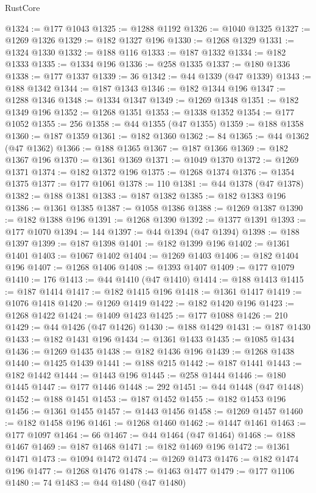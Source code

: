 \begin{lexlean}{RustCore}
\begin{coremodule}
@1324 := @177 @1043
@1325 := @1288 @1192
@1326 := @1040 @1325
@1327 := @1269 @1326
@1329 := @182 @1327 @196
@1330 := @1268 @1329
@1331 := @1324 @1330
@1332 := @188 @116
@1333 := @187 @1332
@1334 := @182 @1333
@1335 := @1334 @196
@1336 := @258 @1335
@1337 := @180 @1336
@1338 := @177 @1337
@1339 := 36
@1342 := @44 @1339 (@47 @1339)
@1343 := @188 @1342
@1344 := @187 @1343
@1346 := @182 @1344 @196
@1347 := @1288 @1346
@1348 := @1334 @1347
@1349 := @1269 @1348
@1351 := @182 @1349 @196
@1352 := @1268 @1351
@1353 := @1338 @1352
@1354 := @177 @1052
@1355 := 256
@1358 := @44 @1355 (@47 @1355)
@1359 := @188 @1358
@1360 := @187 @1359
@1361 := @182 @1360
@1362 := 84
@1365 := @44 @1362 (@47 @1362)
@1366 := @188 @1365
@1367 := @187 @1366
@1369 := @182 @1367 @196
@1370 := @1361 @1369
@1371 := @1049 @1370
@1372 := @1269 @1371
@1374 := @182 @1372 @196
@1375 := @1268 @1374
@1376 := @1354 @1375
@1377 := @177 @1061
@1378 := 110
@1381 := @44 @1378 (@47 @1378)
@1382 := @188 @1381
@1383 := @187 @1382
@1385 := @182 @1383 @196
@1386 := @1361 @1385
@1387 := @1058 @1386
@1388 := @1269 @1387
@1390 := @182 @1388 @196
@1391 := @1268 @1390
@1392 := @1377 @1391
@1393 := @177 @1070
@1394 := 144
@1397 := @44 @1394 (@47 @1394)
@1398 := @188 @1397
@1399 := @187 @1398
@1401 := @182 @1399 @196
@1402 := @1361 @1401
@1403 := @1067 @1402
@1404 := @1269 @1403
@1406 := @182 @1404 @196
@1407 := @1268 @1406
@1408 := @1393 @1407
@1409 := @177 @1079
@1410 := 176
@1413 := @44 @1410 (@47 @1410)
@1414 := @188 @1413
@1415 := @187 @1414
@1417 := @182 @1415 @196
@1418 := @1361 @1417
@1419 := @1076 @1418
@1420 := @1269 @1419
@1422 := @182 @1420 @196
@1423 := @1268 @1422
@1424 := @1409 @1423
@1425 := @177 @1088
@1426 := 210
@1429 := @44 @1426 (@47 @1426)
@1430 := @188 @1429
@1431 := @187 @1430
@1433 := @182 @1431 @196
@1434 := @1361 @1433
@1435 := @1085 @1434
@1436 := @1269 @1435
@1438 := @182 @1436 @196
@1439 := @1268 @1438
@1440 := @1425 @1439
@1441 := @188 @215
@1442 := @187 @1441
@1443 := @182 @1442
@1444 := @1443 @196
@1445 := @258 @1444
@1446 := @180 @1445
@1447 := @177 @1446
@1448 := 292
@1451 := @44 @1448 (@47 @1448)
@1452 := @188 @1451
@1453 := @187 @1452
@1455 := @182 @1453 @196
@1456 := @1361 @1455
@1457 := @1443 @1456
@1458 := @1269 @1457
@1460 := @182 @1458 @196
@1461 := @1268 @1460
@1462 := @1447 @1461
@1463 := @177 @1097
@1464 := 66
@1467 := @44 @1464 (@47 @1464)
@1468 := @188 @1467
@1469 := @187 @1468
@1471 := @182 @1469 @196
@1472 := @1361 @1471
@1473 := @1094 @1472
@1474 := @1269 @1473
@1476 := @182 @1474 @196
@1477 := @1268 @1476
@1478 := @1463 @1477
@1479 := @177 @1106
@1480 := 74
@1483 := @44 @1480 (@47 @1480)

\end{coremodule}
\end{lexlean}

